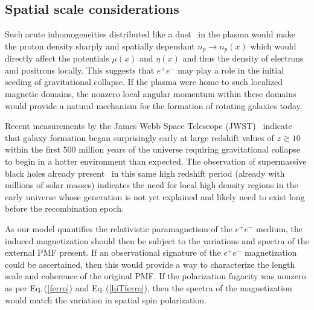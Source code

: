 \documentclass[aps,prd,floatfix,reprint]{revtex4-2}
\newcommand{\req}[1]{Eq.\,(\ref{#1})}
\begin{document}
{\subsection{Spatial scale considerations}

Such acute inhomogeneities distributed like a dust~\cite{Grayson:2023flr} in the plasma would make the proton density sharply and spatially dependant $n_{p}\rightarrow n_{p}(x)$ which would directly affect the potentials $\mu(x)$ and $\eta(x)$ and thus the density of electrons and positrons locally. This suggests that $e^{+}e^{-}$ may play a role in the initial seeding of gravitational collapse. If the plasma were home to such localized magnetic domains, the nonzero local angular momentum within these domains would provide a natural mechanism for the formation of rotating galaxies today.

Recent measurements by the James Webb Space Telescope (JWST)~\citep{Yan:2022sxd,adams2023discovery,arrabal2023spectroscopic} indicate that galaxy formation began surprisingly early at large redshift values of $z\gtrsim10$ within the first 500 million years of the universe requiring gravitational collapse to begin in a hotter environment than expected. The observation of supermassive black holes already present~\citep{CEERSTeam:2023qgy} in this same high redshift period (already with millions of solar masses) indicates the need for local high density regions in the early universe whose generation is not yet explained and likely need to exist long before the recombination epoch.

As our model quantifies the relativistic paramagnetism of the $e^{+}e^{-}$ medium, the induced magnetization should then be subject to the variations and spectra of the external PMF present. If an observational signature of the $e^{+}e^{-}$ magnetization could be ascertained, then this would provide a way to characterize the length scale and coherence of the original PMF. If the polarization fugacity was nonzero as per \req{ferro} and \req{hiTferro}, then the spectra of the magnetization would match the variation in spatial spin polarization.}
\end{document}
